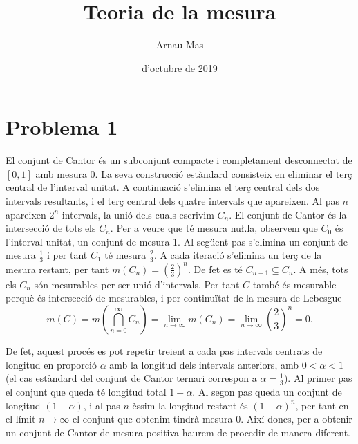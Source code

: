 \documentclass[12pt]{article}
\title{\sffamily {\bfseries Entrega 1:} Teoria de la mesura}
\author{\sffamily Arnau Mas}
\date{\sffamily 18 d'octubre de 2019}
\begin{document}
\maketitle

\section*{Problema 1}
El conjunt de Cantor és un subconjunt compacte i completament desconnectat de \( [0,1] \) amb
mesura 0. La seva construcció estàndard consisteix en eliminar el terç central de
l'interval unitat. A continuació s'elimina el terç central dels dos intervals resultants,
i el terç central dels quatre intervals que apareixen. Al pas \( n \) apareixen \( 2^n \)
intervals, la unió dels cuals escrivim \( C_n \). El conjunt de Cantor és la
intersecció de tots els \( C_n \). Per a veure que té mesura nu\l.la, observem que \( C_0
\) és l'interval unitat, un conjunt de mesura 1. Al següent pas s'elimina un conjunt de
mesura \( \frac{1}{3} \) i per tant \( C_1 \) té mesura \( \frac{2}{3} \). A cada iteració
s'elimina un terç de la mesura restant, per tant \( m(C_n) = \left(\frac{2}{3}\right)^n
\). De fet es té \( C_{n+1} \subseteq C_n \). A més, tots els \( C_n \) són mesurables per
ser unió d'intervals. Per tant \( C \) també és mesurable perquè és intersecció de mesurables, i
per continuïtat de la mesura de Lebesgue
\begin{equation*}
	m(C) = m\left(\bigcap_{n = 0}^{\infty} C_n\right) = \lim_{n \to \infty} m(C_n) = \lim_{n \to
	\infty} \left(\frac{2}{3}\right)^n = 0. 
\end{equation*}

De fet, aquest procés es pot repetir treient a cada pas intervals centrats de longitud
en proporció \( \alpha \) amb la longitud dels intervals anteriors, amb \( 0 < \alpha < 1
\) (el cas estàndard del conjunt de Cantor ternari correspon a \( \alpha = \frac{1}{3}
\)). Al primer pas el conjunt que queda té longitud total \( 1 - \alpha \). Al segon pas
queda un conjunt de longitud \( (1 - \alpha) \), i al pas \( n \)-èssim la longitud
restant és \( (1 - \alpha)^n \), per tant en el límit \( n \to \infty \) el conjunt que
obtenim tindrà mesura 0. Així doncs, per a obtenir un conjunt de Cantor de mesura positiva
haurem de procedir de manera diferent. 
\end{document}
